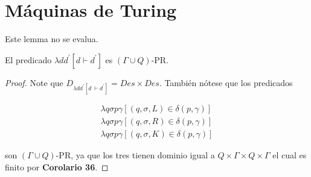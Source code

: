 \section{Máquinas de Turing}

  \begin{lemma}
    \PN Este lemma no se evalua.
  \end{lemma}

  \begin{lemma}
  	\PN El predicado $\lambda dd^{\prime} \left[d \vdash d^{\prime}\right]$ es $(\Gamma \cup Q)$-PR.
  \end{lemma}
	\begin{proof}
	  \PN Note que $D_{\lambda dd^{\prime}\left[d\ \vdash d^{\prime }\right] }=Des\times Des$. También nótese que los
    predicados

    \begin{eqnarray*}
      \lambda q\sigma p\gamma \left[ (q,\sigma ,L)\in \delta (p,\gamma )\right] \\
      \lambda q\sigma p\gamma \left[ (q,\sigma ,R)\in \delta (p,\gamma )\right] \\
      \lambda q\sigma p\gamma \left[ (q,\sigma ,K)\in \delta (p,\gamma )\right]
    \end{eqnarray*}

    \PN son $(\Gamma \cup Q)$-PR, ya que los tres tienen dominio igual a $Q \times \Gamma \times Q \times \Gamma$ el
    cual es finito por \textbf{Corolario 36}.


\end{proof}
